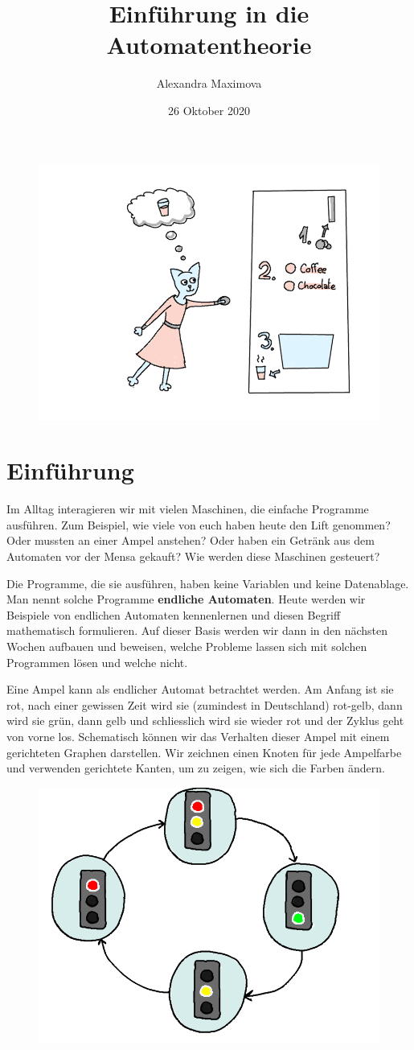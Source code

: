 \documentclass{article}
\title{Einführung in die Automatentheorie}
\author{Alexandra Maximova}
\date{26 Oktober 2020}
\begin{document}
\maketitle

\begin{figure}[H]
\centering
\includegraphics[width=0.6\linewidth]{Pictures/image.png} 
\end{figure}


\section{Einführung}
Im Alltag interagieren wir mit vielen Maschinen, die einfache Programme ausführen. Zum Beispiel, wie viele von euch haben heute den Lift genommen? Oder mussten an einer Ampel anstehen? Oder haben ein Getränk aus dem Automaten vor der Mensa gekauft? Wie werden diese Maschinen gesteuert?

Die Programme, die sie ausführen, haben keine Variablen und keine Datenablage. Man nennt solche Programme \textbf{endliche Automaten}. Heute werden wir Beispiele von endlichen Automaten kennenlernen und diesen Begriff  mathematisch formulieren. Auf dieser Basis werden wir dann in den nächsten Wochen aufbauen und beweisen, welche Probleme lassen sich mit solchen Programmen lösen und welche nicht.

\begin{example}
Eine Ampel kann als endlicher Automat betrachtet werden. Am Anfang ist sie rot, nach einer gewissen Zeit wird sie (zumindest in Deutschland) rot-gelb, dann wird sie grün, dann gelb und schliesslich wird sie wieder rot und der Zyklus geht von vorne los. Schematisch können wir das Verhalten dieser Ampel mit einem gerichteten Graphen darstellen. Wir zeichnen einen Knoten für jede Ampelfarbe und verwenden gerichtete Kanten, um zu zeigen, wie sich die Farben ändern.
\begin{figure}[H]
\centering
\includegraphics[width=0.4\linewidth]{Pictures/Ampel.png} 
\end{figure}
\end{example}
\end{document}
